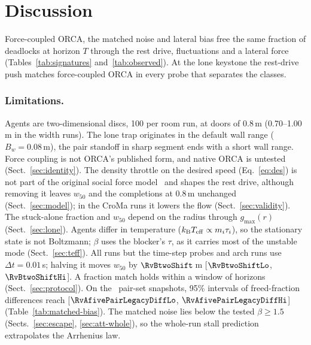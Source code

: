 \section{Discussion}\label{sec:discussion}

Force-coupled ORCA, the matched noise and lateral bias free the same fraction of deadlocks at horizon $T$ through the rest drive, fluctuations and a lateral force (Tables~\ref{tab:signatures} and~\ref{tab:observed}). At the lone keystone the rest-drive push matches force-coupled ORCA in every probe that separates the classes.

\subsubsection{Limitations.}
Agents are two-dimensional discs, 100 per room run, at doors of 0.8\,m (0.70--1.00\,m in the width runs). The lone trap originates in the default wall range ($B_w=0.08$\,m), the pair standoff in sharp segment ends with a short wall range. Force coupling is not ORCA's published form, and native ORCA is untested (Sect.~\ref{sec:identity}). The density throttle on the desired speed (Eq.~\eqref{eq:des}) is not part of the original social force model~\cite{helbing1995,helbing2000nature} and shapes the rest drive, although removing it leaves $w_{50}$ and the completions at 0.8\,m unchanged (Sect.~\ref{sec:model}); in the CroMa runs it lowers the flow (Sect.~\ref{sec:validity}).
The stuck-alone fraction and $w_{50}$ depend on the radius through $g_{\max}(r)$ (Sect.~\ref{sec:lone}).
Agents differ in temperature ($k_{\rm B}T_{\rm eff}\propto m_i\tau_i$), so the stationary state is not Boltzmann; $\beta$ uses the blocker's $\tau$, as it carries most of the unstable mode (Sect.~\ref{sec:teff}).
All runs but the time-step probes and arch runs use $\Delta t=0.01$\,s; halving it moves $w_{50}$ by $\RvBtwoShift$\,m [$\RvBtwoShiftLo$, $\RvBtwoShiftHi$].
A fraction match holds within a window of horizons (Sect.~\ref{sec:protocol}). On the \PairN\ pair-set snapshots, 95\% intervals of freed-fraction differences reach [$\RvAfivePairLegacyDiffLo$, $\RvAfivePairLegacyDiffHi$] (Table~\ref{tab:matched-bias}). The matched noise lies below the tested $\beta\ge1.5$ (Sects.~\ref{sec:escape}, \ref{sec:att-whole}), so the whole-run stall prediction extrapolates the Arrhenius law.
